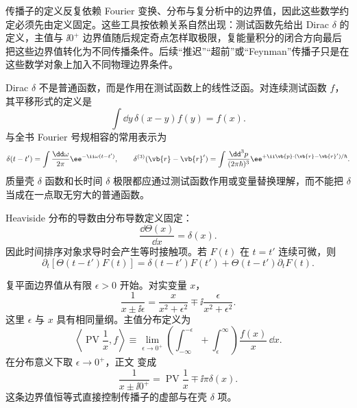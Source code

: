 
传播子的定义反复依赖 Fourier 变换、分布与复分析中的边界值，因此这些数学约定必须先由定义固定。这些工具按依赖关系自然出现：测试函数先给出 Dirac $\delta$ 的定义，主值与 $\ii0^+$ 边界值随后规定奇点怎样取极限，复能量积分的闭合方向最后把这些边界值转化为不同传播条件。后续“推迟”“超前”或“Feynman”传播子只是在这些数学对象上加入不同物理边界条件。

Dirac $\delta$ 不是普通函数，而是作用在测试函数上的线性泛函。对连续测试函数 $f$，其平移形式的定义是
\begin{equation}
 {
 \int\dd y\,\delta(x-y)f(y)=f(x).}
 \label{eq:delta-def-action-r13}
\end{equation}
与全书 Fourier 号规相容的常用表示为
\begin{equation}
 {
 \delta(t-t')
 =\int\frac{\dd\omega}{2\pi}\ee^{-\ii\omega(t-t')},
 \qquad
 \delta^{(3)}(\vb{r}-\vb{r}')
 =\int\frac{\dd^3 p}{(2\pi\hbar)^3}
 \ee^{+\ii\vb{p}\cdot(\vb{r}-\vb{r}')/\hbar}.}
 \label{eq:delta-fourier-representation-dp68}
\end{equation}
质量壳 $\delta$ 函数和长时间 $\delta$ 极限都应通过测试函数作用或变量替换理解，而不能把 $\delta$ 当成在一点取无穷大的普通函数。

Heaviside 分布的导数由分布导数定义固定：
\begin{equation}
 {\frac{\dd\Theta(x)}{\dd x}=\delta(x).}
 \label{eq:heaviside-delta-dp68}
\end{equation}
因此时间排序对象求导时会产生等时接触项。若 $F(t)$ 在 $t=t'$ 连续可微，则
\begin{equation}
 {
 \partial_t[\Theta(t-t')F(t)]
 =\delta(t-t')F(t')
 +\Theta(t-t')\partial_tF(t).}
 \label{eq:theta-product-derivative-dp68}
\end{equation}

复平面边界值从有限 $\epsilon>0$ 开始。对实变量 $x$，
\begin{equation}
 {
 \frac1{x\pm\ii\epsilon}
 =\frac{x}{x^2+\epsilon^2}
 \mp\ii\frac{\epsilon}{x^2+\epsilon^2}.}
 \label{eq:plemelj-split-r13}
\end{equation}
这里 $\epsilon$ 与 $x$ 具有相同量纲。主值分布定义为
\begin{equation}
 {
 \left\langle\operatorname{PV}\frac1x,f\right\rangle
 \equiv\lim_{\epsilon\to0^+}
 \left(\int_{-\infty}^{-\epsilon}+\int_{\epsilon}^{\infty}\right)
 \frac{f(x)}x\,\dd x.}
 \label{eq:principal-value-definition-dp68}
\end{equation}
在分布意义下取 $\epsilon\to0^+$，正文 变成
\begin{equation}
 {
 \frac1{x\pm\ii0^+}
 =\operatorname{PV}\frac1x\mp\ii\pi\delta(x).}
 \label{eq:sokhotski-plemelj-dp68}
\end{equation}
这条边界值恒等式直接控制传播子的虚部与在壳 $\delta$ 项。

